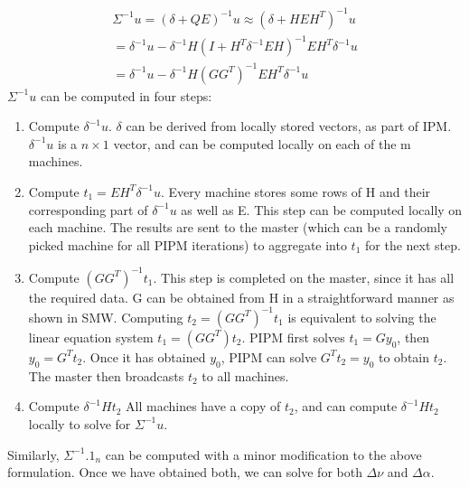 \documentclass[12pt]{article}
\begin{document}
 \begin{gather} 
\Sigma^{-1}u = (\delta+QE)^{-1}u≈(\delta+HEH^T)^{-1}u\\
= \delta^{-1}u - \delta^{-1}H(I + H^T \delta^{-1}EH)^{-1}EH^T \delta^{-1}u\\
= \delta^{-1}u - \delta^{-1}H(GG^{T})^{-1}EH^T \delta^{-1}u
\end{gather}
$\Sigma^{-1}u$ can be computed in four steps:
\begin{enumerate}
\item Compute $\delta^{-1}u$. $\delta$ can be derived from locally stored vectors, as part of IPM. $\delta^{-1}u$ is a $n \times 1$ vector, and can be computed locally on each of the m machines.
\item Compute $t_{1} = EH^{T} \delta^{-1}u$. Every machine stores some rows of H and their corresponding part of $\delta^{-1}u$ as well as E. This step can be computed locally on each machine. The results are sent to the master (which can be a randomly picked machine for all PIPM iterations) to aggregate into $t_{1}$ for the next step.
\item Compute $(GG^T )^{-1}t_{1}$. This step is completed on the master, since it has all the required data. G can be obtained from H in a straightforward manner as shown in SMW. Computing $t_{2} = (GG^T )^{-1}t_{1}$ is equivalent to solving the linear equation system $t_{1} = (GG^T )t_{2}$. PIPM first solves $t_{1} = Gy_{0}$, then $y_{0} = G^T t_{2}$. Once it has obtained $y_{0}$, PIPM can solve $G^T t_{2} = y_{0}$ to obtain $t_{2}$. The master then broadcasts $t_{2}$ to all machines.
\item Compute $\delta^{-1}Ht_{2}$ All machines have a copy of $t_{2}$, and can compute $\delta^{-1}Ht_{2}$ locally to solve for $\Sigma^{-1}u$.
\end{enumerate}
Similarly, $\Sigma^{-1}.1_{n}$ can be computed with a minor modification to the above formulation. Once we have obtained both, we can solve for both $\Delta\nu$ and $\Delta\alpha$.
\end{document}
